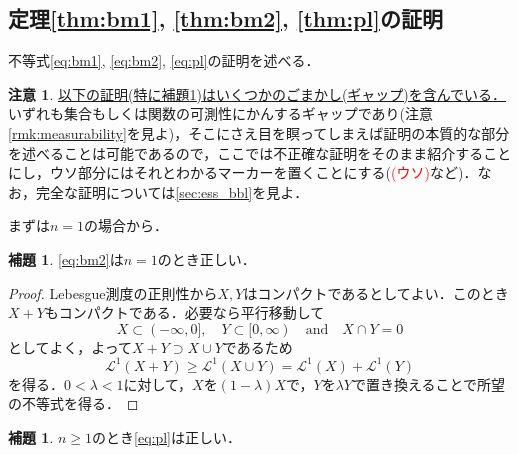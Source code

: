 \documentclass[a4j]{ltjsarticle}
\newcommand{\Lm}{\mathcal{L}}
\newcommand{\1}{\bm{1}}
\numberwithin{equation}{section}
\theoremstyle{definition}
\newtheorem{lem}[thm]{補題}
\newtheorem{rmk}[thm]{注意}
\begin{document}
\subsection{定理\ref{thm:bm1}, \ref{thm:bm2}, \ref{thm:pl}の証明}
不等式\eqref{eq:bm1}, \eqref{eq:bm2}, \eqref{eq:pl}の証明を述べる．
\begin{rmk}\label{rmk:gap}
    \underline{以下の証明(特に補題\ref{lem:proof_of_pl})はいくつかのごまかし(ギャップ)を含んでいる．}いずれも集合もしくは関数の可測性にかんするギャップであり(注意\ref{rmk:measurability}を見よ)，そこにさえ目を瞑ってしまえば証明の本質的な部分を述べることは可能であるので，ここでは不正確な証明をそのまま紹介することにし，ウソ部分にはそれとわかるマーカーを置くことにする(\textcolor{red}{(ウソ)}など)．なお，完全な証明については\ref{sec:ess_bbl}を見よ．
\end{rmk}
まずは$n=1$の場合から．
\begin{lem}\label{lem:bm2_1}
    \eqref{eq:bm2}は$n=1$のとき正しい．
\end{lem}
\begin{proof}
    Lebesgue測度の正則性から$X,Y$はコンパクトであるとしてよい．このとき$X+Y$もコンパクトである．必要なら平行移動して
    \begin{equation}
        X\subset (-\infty,0],\quad Y\subset [0,\infty)\quad \text{and}\quad X\cap Y=\qty{0}
    \end{equation}
    としてよく，よって$X+Y\supset X\cup Y$であるため
    \begin{equation}
        \Lm^1(X+Y)\geq \Lm^1(X\cup Y)=\Lm^1(X)+\Lm^1(Y)
    \end{equation}
    を得る．$0<\lambda<1$に対して，$X$を$(1-\lambda)X$で，$Y$を$\lambda Y$で置き換えることで所望の不等式を得る．
\end{proof}
\begin{lem}\label{lem:proof_of_pl}
    $n\geq1$のとき\eqref{eq:pl}は正しい．
\end{lem}
\end{document}
